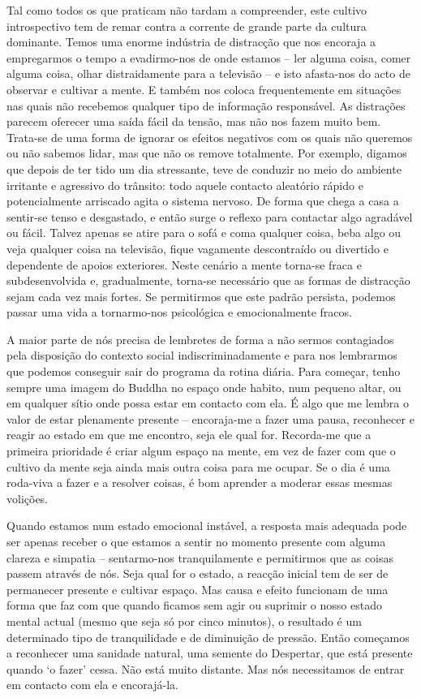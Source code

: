 Tal como todos os que praticam não tardam a compreender, este cultivo
introspectivo tem de remar contra a corrente de grande parte da cultura
dominante. Temos uma enorme indústria de distracção que nos encoraja a
empregarmos o tempo a evadirmo-nos de onde estamos -- ler alguma coisa, comer
alguma coisa, olhar distraidamente para a televisão -- e isto afasta-nos do acto
de observar e cultivar a mente. E também nos coloca frequentemente em situações
nas quais não recebemos qualquer tipo de informação responsável. As distrações
parecem oferecer uma saída fácil da tensão, mas não nos fazem muito bem.
Trata-se de uma forma de ignorar os efeitos negativos com os quais não queremos
ou não sabemos lidar, mas que não os remove totalmente. Por exemplo, digamos que
depois de ter tido um dia stressante, teve de conduzir no meio do ambiente
irritante e agressivo do trânsito: todo aquele contacto aleatório rápido e
potencialmente arriscado agita o sistema nervoso. De forma que chega a casa a
sentir-se tenso e desgastado, e então surge o reflexo para contactar algo
agradável ou fácil. Talvez apenas se atire para o sofá e coma qualquer coisa,
beba algo ou veja qualquer coisa na televisão, fique vagamente descontraído ou
divertido e dependente de apoios exteriores. Neste cenário a mente torna-se
fraca e subdesenvolvida e, gradualmente, torna-se necessário que as formas de
distracção sejam cada vez mais fortes. Se permitirmos que este padrão persista,
podemos passar uma vida a tornarmo-nos psicológica e emocionalmente fracos.

A maior parte de nós precisa de lembretes de forma a não sermos contagiados pela
disposição do contexto social indiscriminadamente e para nos lembrarmos que
podemos conseguir sair do programa da rotina diária. Para começar, tenho sempre
uma imagem do Buddha no espaço onde habito, num pequeno altar, ou em qualquer
sítio onde possa estar em contacto com ela. É algo que me lembra o valor de
estar plenamente presente -- encoraja-me a fazer uma pausa, reconhecer e reagir
ao estado em que me encontro, seja ele qual for. Recorda-me que a primeira
prioridade é criar algum espaço na mente, em vez de fazer com que o cultivo da
mente seja ainda mais outra coisa para me ocupar. Se o dia é uma roda-viva a
fazer e a resolver coisas, é bom aprender a moderar essas mesmas volições.

Quando estamos num estado emocional instável, a resposta mais adequada pode ser
apenas receber o que estamos a sentir no momento presente com alguma clareza e
simpatia -- sentarmo-nos tranquilamente e permitirmos que as coisas passem
através de nós. Seja qual for o estado, a reacção inicial tem de ser de
permanecer presente e cultivar espaço. Mas causa e efeito funcionam de uma forma
que faz com que quando ficamos sem agir ou suprimir o nosso estado mental actual
(mesmo que seja só por cinco minutos), o resultado é um determinado tipo de
tranquilidade e de diminuição de pressão. Então começamos a reconhecer uma
sanidade natural, uma semente do Despertar, que está presente quando `o fazer'
cessa. Não está muito distante. Mas nós necessitamos de entrar em contacto com
ela e encorajá-la.

